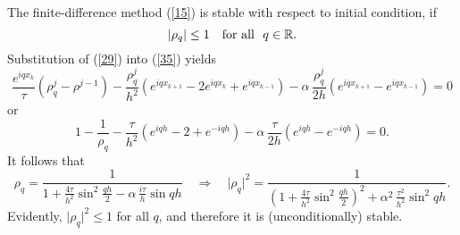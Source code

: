 \documentclass[10pt]{article}
\begin{document}
\vskip 0.2cm
\noindent
The finite-difference method (\ref{15}) is stable with respect to
initial condition, if
\[
\vert\rho_{q}\vert\leq 1 \quad {\rm for \ all} \ \ q\in{\mathbb R}.
\]
Substitution of (\ref{29}) into (\ref{35}) yields
\[
\frac{e^{iqx_{k}}}{\tau}\left(\rho_{q}^{j}-\rho^{j-1}\right)-
\frac{\rho_{q}^{j}}{h^{2}}\left(e^{iqx_{k+1}}-2e^{iqx_{k}}+e^{iqx_{k-1}}\right)-
\alpha \, \frac{\rho_{q}^{j}}{2h}\left(e^{iqx_{k+1}}-e^{iqx_{k-1}}\right)=0
\]
or
\[
1-\frac{1}{\rho_{q}}-
\frac{\tau}{h^{2}}\left(e^{iqh}-2+e^{-iqh}\right) - \alpha \, \frac{\tau}{2h}\left(e^{iqh}-e^{-iqh}\right)=0.
\]
It follows that
\[
\rho_{q}=\frac{1}{1+
\frac{4\tau}{h^{2}}\sin^{2} \frac{qh}{2}-\alpha \,\frac{i\tau}{h}\sin qh}
\quad \Rightarrow \quad 
\vert\rho_{q}\vert^{2}=\frac{1}{\left(1+
\frac{4\tau}{h^{2}}\sin^{2} \frac{qh}{2}\right)^{2}+\alpha^2 \, \frac{\tau^{2}}{h^{2}}\sin^{2} qh}.
\]
Evidently, $\vert\rho_{q}\vert^{2}\leq 1$ for all $q$, and therefore it is (unconditionally)
stable.
\end{document}
